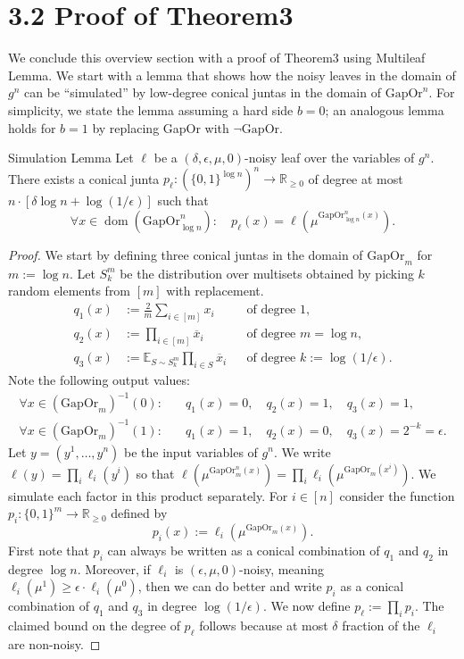 \section*{3.2 Proof of Theorem3}
We conclude this overview section with a proof of Theorem3 using Multileaf Lemma. We start with a lemma that shows how the noisy leaves in the domain of $g^n$ can be ``simulated'' by low-degree conical juntas in the domain of $\mathrm{GapOr}^n$. For simplicity, we state the lemma assuming a hard side $b=0$; an analogous lemma holds for $b=1$ by replacing GapOr with $\neg\mathrm{GapOr}$.
\begin{authorclaim}{Simulation Lemma}
Let $\ell$ be a $(\delta,\epsilon,\mu,0)$-noisy leaf over the variables of $g^n$. There exists a conical junta $p_\ell:(\{0,1\}^{\log n})^n\to\mathbb R_{\ge0}$ of degree at most $n\cdot[\delta\log n+\log(1/\epsilon)]$ such that
\[\forall x\in\operatorname{dom}(\mathrm{GapOr}_{\log n}^n):\quad p_\ell(x)=\ell(\mu^{\mathrm{GapOr}_{\log n}^n(x)}).\]
\end{authorclaim}
\begin{proof}
We start by defining three conical juntas in the domain of $\mathrm{GapOr}_m$ for $m:=\log n$. Let $S_k^m$ be the distribution over multisets obtained by picking $k$ random elements from $[m]$ with replacement.
\begin{align*}
q_1(x)&:=\tfrac2m\sum_{i\in[m]}x_i&&\text{of degree }1,\\
q_2(x)&:=\prod_{i\in[m]}\overline x_i&&\text{of degree }m=\log n,\\
q_3(x)&:=\mathbb E_{S\sim S_k^m}\prod_{i\in S}\overline x_i&&\text{of degree }k:=\log(1/\epsilon).
\end{align*}
Note the following output values:
\begin{align*}
\forall x\in(\mathrm{GapOr}_m)^{-1}(0):&\quad q_1(x)=0,\quad q_2(x)=1,\quad q_3(x)=1,\\
\forall x\in(\mathrm{GapOr}_m)^{-1}(1):&\quad q_1(x)=1,\quad q_2(x)=0,\quad q_3(x)=2^{-k}=\epsilon.
\end{align*}
Let $y=(y^1,\ldots,y^n)$ be the input variables of $g^n$. We write $\ell(y)=\prod_i\ell_i(y^i)$ so that $\ell(\mu^{\mathrm{GapOr}_m^n(x)})=\prod_i\ell_i(\mu^{\mathrm{GapOr}_m(x^i)})$. We simulate each factor in this product separately. For $i\in[n]$ consider the function $p_i:\{0,1\}^m\to\mathbb R_{\ge0}$ defined by
\[p_i(x):=\ell_i(\mu^{\mathrm{GapOr}_m(x)}).\]
First note that $p_i$ can always be written as a conical combination of $q_1$ and $q_2$ in degree $\log n$. Moreover, if $\ell_i$ is $(\epsilon,\mu,0)$-noisy, meaning $\ell_i(\mu^1)\ge\epsilon\cdot\ell_i(\mu^0)$, then we can do better and write $p_i$ as a conical combination of $q_1$ and $q_3$ in degree $\log(1/\epsilon)$. We now define $p_\ell:=\prod_ip_i$. The claimed bound on the degree of $p_\ell$ follows because at most $\delta$ fraction of the $\ell_i$ are non-noisy.
\end{proof}
